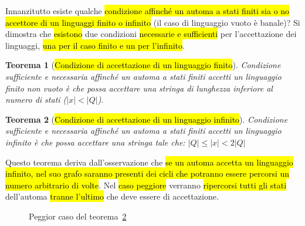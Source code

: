 \documentclass[a4paper,11pt,oneside]{article}
\theoremstyle{plain}
\newtheorem{thm}{Teorema}[section]
\theoremstyle{definition}
\theoremstyle{remark}
\begin{document}
Innanzitutto esiste qualche \hl{condizione affinché un automa a stati finiti sia
o no accettore di un linguaggi finito o infinito} (il caso di linguaggio vuoto è
banale)? Si dimostra che \hl{esistono} due condizioni \hl{necessarie e
sufficienti} per l'accettazione dei linguaggi, \hl{una per il caso finito e un
per l'infinito}.

\begin{thm}[\hl{Condizione di accettazione di un linguaggio finito}]\label{thm:accettazione-ling-finito}
  Condizione sufficiente e necessaria affinché un automa a stati finiti accetti
  un linguaggio finito non vuoto è che possa accettare una stringa di lunghezza
  inferiore al numero di stati ($|x| < |Q|$).
\end{thm}

\begin{thm}[\hl{Condizione di accettazione di un linguaggio infinito}]\label{thm:accettazione-ling-infinito}
  Condizione sufficiente e necessaria affinché un automa a stati finiti accetti
  un linguaggio infinito è che possa accettare una stringa tale che:
  $|Q| \leq |x| < 2|Q|$
\end{thm}

Questo teorema deriva dall'osservazione che \hl{se un automa accetta un
linguaggio infinito, nel suo grafo saranno presenti dei cicli che potranno
essere percorsi un numero arbitrario di volte}. Nel \hl{caso peggiore} verranno
\hl{ripercorsi tutti gli stati} dell'automa \hl{tranne l'ultimo} che deve essere
di accettazione.

\begin{figure}[htb]
  \centering
  \caption{Peggior caso del teorema~\ref{thm:accettazione-ling-infinito}}\label{fig:fsa-accettazione-ling-infinito}
\end{figure}
\end{document}
